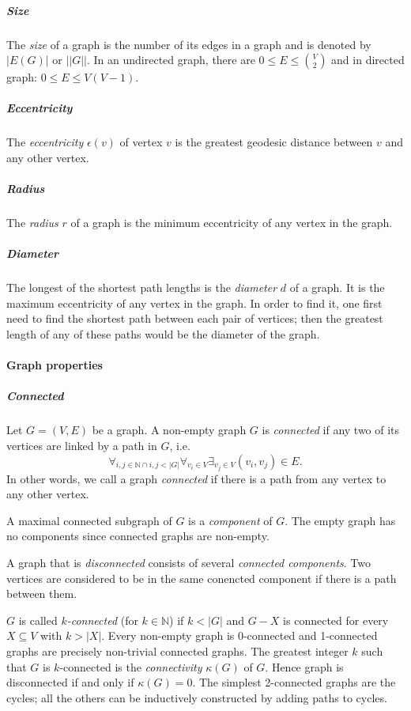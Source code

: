         \subparagraph{Size}

          The \emph{size} of a graph is the number of its edges\cite{Harris2000} in a graph and is denoted by $|E(G)|$ or $||G||$. In an undirected graph, there are $0 \leq E \leq \binom{V}{2}$ and in directed graph: $0 \leq E \leq V(V-1)$. 

        \subparagraph{Eccentricity}    

          The \emph{eccentricity} $\epsilon(v)$ of vertex $v$ is the greatest geodesic distance between $v$ and any other vertex.    
                    
        \subparagraph{Radius}

          The \emph{radius} $r$ of a graph is the minimum eccentricity of any vertex in the graph.

        \subparagraph{Diameter}
        
          The longest of the shortest path lengths is the \emph{diameter} $d$ of a graph. It is the maximum eccentricity of any vertex in the graph. In order to find it, one first need to find the shortest path between each pair of vertices; then the greatest length of any of these paths would be the diameter of the graph.

      \paragraph{Graph properties}

        \subparagraph{Connected}

          Let $G = (V, E)$ be a graph. A non-empty graph $G$ is \emph{connected} if any two of its vertices are linked by a path in $G$, i.e. 
          $$\forall_{i,j \in \mathbb{N} \cap i,j < |G|} \forall_{v_i \in V} \exists_{v_j \in V} (v_i, v_j) \in E\mbox{.}$$
          In other words, we call a graph \emph{connected} if there is a path from any vertex to any other vertex.

          A maximal connected subgraph of $G$ is a \emph{component} of $G$. The empty graph has no components since connected graphs are non-empty. 

          A graph that is \emph{disconnected} consists of several \emph{connected components}. Two vertices are considered to be in the same conencted component if there is a path between them.

          $G$ is called $k$\emph{-connected} (for $k \in \mathbb{N}$) if $k < |G|$ and $G - X$ is connected for every $X \subseteq V$ with $k > |X|$. Every non-empty graph is 0-connected and 1-connected graphs are precisely non-trivial connected graphs. The greatest integer $k$ such that $G$ is $k$-connected is the \emph{connectivity} $\kappa(G)$ of $G$. Hence graph is disconnected if and only if $\kappa(G) = 0$. The simplest 2-connected graphs are the cycles; all the others can be inductively constructed by adding paths to cycles.

